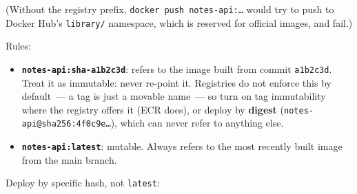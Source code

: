 \begin{codebox}[short]

\begin{Shaded}
\begin{Highlighting}[]
\OperatorTok{=}\VariableTok{$(}\VariableTok{)}  
\OperatorTok{=}

\DataTypeTok{\textbackslash{}}
    \DataTypeTok{\textbackslash{}}
   \DataTypeTok{\textbackslash{}}

\end{Highlighting}
\end{Shaded}

\end{codebox}

\noindent{}(Without the registry prefix, \texttt{docker\ push\ notes-api:…} would try to push to Docker Hub's \texttt{library/} namespace, which is reserved for official images, and fail.)

Rules:

\begin{itemize}
\tightlist
\item
  \textbf{\texttt{notes-api:sha-a1b2c3d}}: refers to the image built from commit \texttt{a1b2c3d}. Treat it as immutable: never re-point it. Registries do not enforce this by default~--- a tag is just a movable name~--- so turn on tag immutability where the registry offers it (ECR does), or deploy by \textbf{digest} (\texttt{notes-}\allowbreak{}\texttt{api@sha256:}\allowbreak{}\texttt{4f0c9e…}), which can never refer to anything else.
\item
  \textbf{\texttt{notes-api:latest}}: mutable. Always refers to the most recently built image from the main branch.
\end{itemize}

\noindent{}Deploy by specific hash, not \texttt{latest}:

